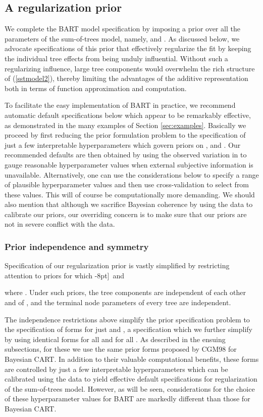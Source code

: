 \documentclass[aoas,nameyear,dvips]{arximspdf}
\begin{document}
\subsection{A regularization prior} \label{sec:prior}

We complete the BART model specification by imposing a prior over all
the parameters of the sum-of-trees model, namely,
 and .   As discussed below, we
advocate specifications of this prior that effectively regularize the
fit  by keeping the individual tree effects from being unduly
influential.   Without such a regularizing influence, large tree
components would overwhelm the rich structure of (\ref{sstmodel2}),
thereby limiting the advantages of the additive representation both in
terms of function approximation and computation.

To facilitate the easy implementation of BART in practice, we recommend
automatic default specifications below which appear to be remarkably
effective, as demonstrated in the many examples of Section
\ref{sec:examples}.  Basically we proceed by first reducing the prior
formulation problem to the specification of just a few interpretable
hyperparameters which govern priors on ,  and .  Our
recommended defaults are then obtained by using the observed variation
in  to gauge reasonable hyperparameter values when external
subjective information is unavailable.  Alternatively, one can use the
considerations below to specify a range of plausible hyperparameter
values and then use cross-validation to select from these values.  This
will of course be computationally more demanding.  We should also
mention that although we sacrifice Bayesian coherence by using the data
to calibrate our priors, our overriding concern is to make sure that
our priors are not in severe conflict with the data.


\subsubsection{Prior independence and symmetry}\label{sec:simplification}


Specification of our regularization prior is vastly simplified by restricting attention to
priors for which
-8pt]\
and

where .  Under such
priors, the tree components  are independent of each other and of
 , and the terminal node parameters of every tree are
independent.


The independence restrictions above simplify the prior specification
problem to the specification of forms for just  and , a specification which we further simplify by
using identical forms for all  and for all
.  As described in the ensuing
subsections, for these we use the same prior forms proposed by CGM98 for
Bayesian CART.  In addition to their valuable computational
benefits, these forms are controlled by just a few interpretable
hyperparameters which can be calibrated using the data to yield
effective default specifications for regularization of the sum-of-trees model.
However, as will be seen, considerations for the choice of these hyperparameter
values for BART are markedly different than those for Bayesian CART.
\end{document}
